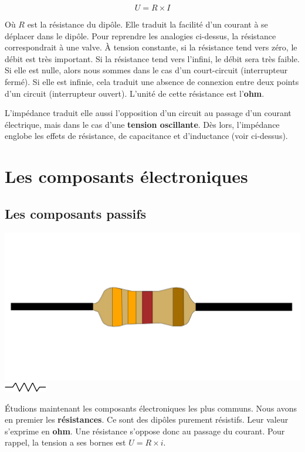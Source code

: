 \documentclass[
]{book}
\begin{document}
\[ U = R \times I \]

Où \(R\) est la résistance du dipôle. Elle traduit la facilité d'un courant à se déplacer dans le dipôle. Pour reprendre les analogies ci-dessus, la résistance correspondrait à une valve. À tension constante, si la résistance tend vers zéro, le débit est très important. Si la résistance tend vers l'infini, le débit sera très faible. Si elle est nulle, alors nous sommes dans le cas d'un court-circuit (interrupteur fermé). Si elle est infinie, cela traduit une absence de connexion entre deux points d'un circuit (interrupteur ouvert). L'unité de cette résistance est l'\textbf{ohm}.

L'impédance traduit elle aussi l'opposition d'un circuit au passage d'un courant électrique, mais dans le cas d'une \textbf{tension oscillante}. Dès lors, l'impédance englobe les effets de résistance, de capacitance et d'inductance (voir ci-dessus).

\hypertarget{les-composants-uxe9lectroniques}{%
\section{Les composants électroniques}\label{les-composants-uxe9lectroniques}}

\hypertarget{les-composants-passifs}{%
\subsection{Les composants passifs}\label{les-composants-passifs}}

\includegraphics[width=0.25\linewidth]{_resources/diagrams/resistor} \includegraphics[width=0.25\linewidth]{_resources/diagrams/resistor_sym}

Étudions maintenant les composants électroniques les plus communs. Nous avons en premier les \textbf{résistances}. Ce sont des dipôles purement résistifs. Leur valeur s'exprime en \textbf{ohm}. Une résistance s'oppose donc au passage du courant. Pour rappel, la tension a ses bornes est \(U = R \times i\).
\end{document}
